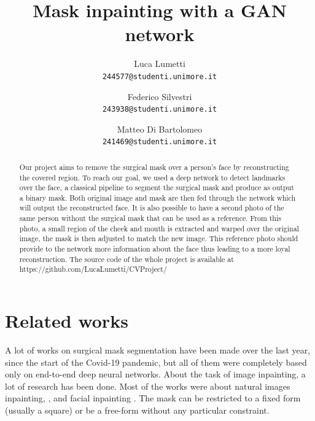 \documentclass[10pt,twocolumn,letterpaper]{article}
\begin{document}
\title{Mask inpainting with a GAN network}

\author{Luca Lumetti\\
{\tt\small 244577@studenti.unimore.it}
\and
Federico Silvestri\\
{\tt\small 243938@studenti.unimore.it}
\and
Matteo Di Bartolomeo\\
{\tt\small 241469@studenti.unimore.it}
}

\maketitle


\begin{abstract}
  Our project aims to remove the surgical mask over a person's face by
  reconstructing the covered region. To reach our goal, we used a deep network
  to detect landmarks over the face, a classical pipeline to segment the
  surgical mask and produce as output a binary mask. Both original image and
  mask are then fed through the network which will output the reconstructed
  face. It is also possible to have a second photo of the same person without
  the surgical mask that can be used as a reference. From this photo, a small
  region of the cheek and mouth is extracted and warped over the original image,
  the mask is then adjusted to match the new image. This reference photo should
  provide to the network more information about the face thus leading to a more
  loyal reconstruction. The source code of the whole project is available at
  https://github.com/LucaLumetti/CVProject/
\end{abstract}

\section{Related works}
A lot of works on surgical mask segmentation have been made over the last year, since
the start of the Covid-19 pandemic, but all of them were completely based only on
end-to-end deep neural networks. About the task of image inpainting, a lot of
research has been done. Most of the works were about natural images inpainting,
\cite{yu2019free} \cite{li2020deepgin}, and facial
inpainting \cite{iizuka2017globally} \cite{li2017generative}
\cite{li2020learning}. The mask can be restricted to a fixed form (usually a
square) or be a free-form without any particular constraint.\\
\end{document}
